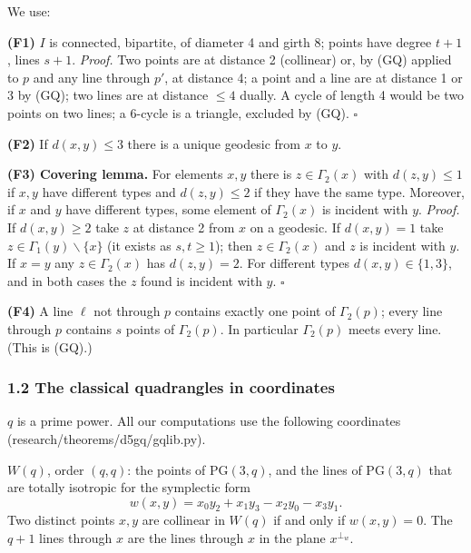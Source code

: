 \documentclass[
  11pt,
]{article}
\begin{document}
We use:

\textbf{(F1)} \(I\) is connected, bipartite, of diameter 4 and girth 8;
points have degree \(t+1\), lines \(s+1\). \emph{Proof.} Two points are
at distance 2 (collinear) or, by (GQ) applied to \(p\) and any line
through \(p'\), at distance 4; a point and a line are at distance 1 or 3
by (GQ); two lines are at distance \(\le 4\) dually. A cycle of length 4
would be two points on two lines; a 6-cycle is a triangle, excluded by
(GQ). \(\square\)

\textbf{(F2)} If \(d(x,y)\le 3\) there is a unique geodesic from \(x\)
to \(y\).

\textbf{(F3) Covering lemma.} For elements \(x,y\) there is
\(z\in\Gamma_2(x)\) with \(d(z,y)\le 1\) if \(x,y\) have different types
and \(d(z,y)\le 2\) if they have the same type. Moreover, if \(x\) and
\(y\) have different types, some element of \(\Gamma_2(x)\) is incident
with \(y\). \emph{Proof.} If \(d(x,y)\ge 2\) take \(z\) at distance 2
from \(x\) on a geodesic. If \(d(x,y) = 1\) take
\(z\in\Gamma_1(y)\smallsetminus\{x\}\) (it exists as \(s,t\ge 1\)); then
\(z\in\Gamma_2(x)\) and \(z\) is incident with \(y\). If \(x = y\) any
\(z\in\Gamma_2(x)\) has \(d(z,y) = 2\). For different types
\(d(x,y)\in\{1,3\}\), and in both cases the \(z\) found is incident with
\(y\). \(\square\)

\textbf{(F4)} A line \(\ell\) not through \(p\) contains exactly one
point of \(\Gamma_2(p)\); every line through \(p\) contains \(s\) points
of \(\Gamma_2(p)\). In particular \(\Gamma_2(p)\) meets every line.
(This is (GQ).)

\hypertarget{the-classical-quadrangles-in-coordinates}{%
\subsubsection{1.2 The classical quadrangles in
coordinates}\label{the-classical-quadrangles-in-coordinates}}

\(q\) is a prime power. All our computations use the following
coordinates (research/theorems/d5gq/gqlib.py).

\textbf{\(W(q)\)}, order \((q,q)\): the points of \(\mathrm{PG}(3,q)\),
and the lines of \(\mathrm{PG}(3,q)\) that are totally isotropic for the
symplectic form \[w(x,y) = x_0y_2 + x_1y_3 - x_2y_0 - x_3y_1 .\] Two
distinct points \(x,y\) are collinear in \(W(q)\) if and only if
\(w(x,y) = 0\). The \(q+1\) lines through \(x\) are the lines through
\(x\) in the plane \(x^{\perp_w}\).
\end{document}
